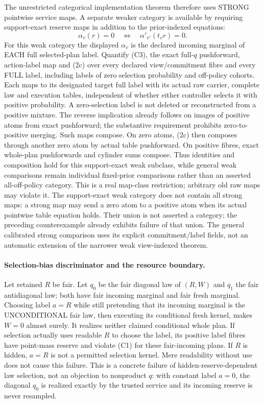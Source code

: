 \documentclass{article}
\begin{document}
The unrestricted categorical implementation theorem therefore uses STRONG pointwise service maps. A separate weaker category is available by requiring support-exact reserve maps in addition to the prior-indexed equations:
\[
 \alpha_v(r)=0\quad\Longleftrightarrow\quad
 \alpha\prime_{v\prime}(t_vr)=0.\tag{C3}
\]
For this weak category the displayed $\alpha_v$ is the declared incoming marginal of EACH full selected-plan label. Quantify (C3), the exact full-$q$ pushforward, action-label map and (2c) over every declared view/commitment fibre and every FULL label, including labels of zero selection probability and off-policy cohorts. Each maps to its designated target full label with its actual raw carrier, complete law and execution tables, independent of whether either controller selects it with positive probability. A zero-selection label is not deleted or reconstructed from a positive mixture. The reverse implication already follows on images of positive atoms from exact pushforward; the substantive requirement prohibits zero-to-positive merging. Such maps compose. On zero atoms, (2c) then composes through another zero atom by actual table pushforward. On positive fibres, exact whole-plan pushforwards and cylinder sums compose. Thus identities and composition hold for this support-exact weak subclass, while general weak comparisons remain individual fixed-prior comparisons rather than an asserted all-off-policy category. This is a real map-class restriction; arbitrary old raw maps may violate it. The support-exact weak category does not contain all strong maps: a strong map may send a zero atom to a positive atom when its actual pointwise table equation holds. Their union is not asserted a category; the preceding counterexample already exhibits failure of that union. The general calibrated strong comparison uses its explicit commitment/label fields, not an automatic extension of the narrower weak view-indexed theorem.

\paragraph{Selection-bias discriminator and the resource boundary.}
Let retained $R$ be fair. Let $q_0$ be the fair diagonal law of $(R,W)$ and $q_1$ the fair antidiagonal law; both have fair incoming marginal and fair fresh marginal. Choosing label $a=R$ while still pretending that its incoming marginal is the UNCONDITIONAL fair law, then executing its conditional fresh kernel, makes $W=0$ almost surely. It realizes neither claimed conditional whole plan. If selection actually uses readable $R$ to choose the label, its positive label fibres have point-mass reserve and violate (C1) for these fair-incoming plans. If $R$ is hidden, $a=R$ is not a permitted selection kernel. Mere readability without use does not cause this failure. This is a concrete failure of hidden-reserve-dependent law selection, not an objection to nonproduct $q$: with constant label $a=0$, the diagonal $q_0$ is realized exactly by the trusted service and its incoming reserve is never resampled.
\end{document}
